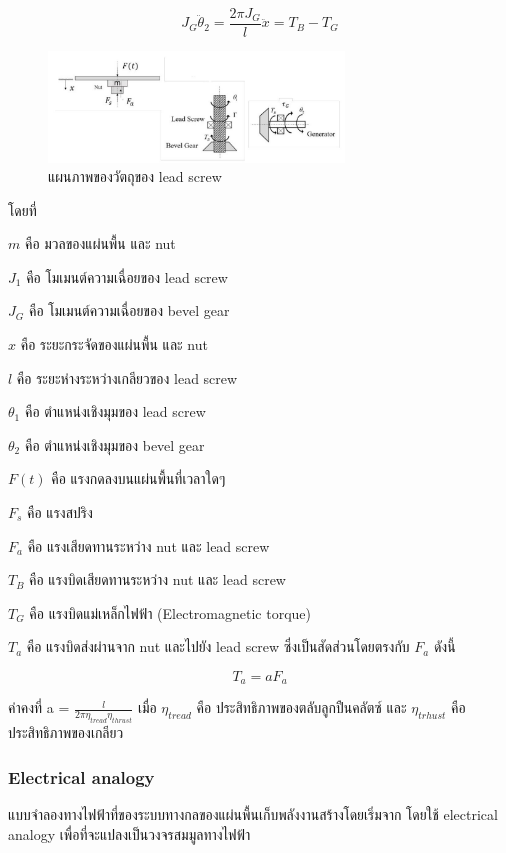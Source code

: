 \documentclass[11pt,a4paper]{article}
\begin{document}
\begin{equation}
    J_{G}\ddot{\theta}_{2} = \frac{2\pi J_{G}}{l}\ddot{x} = T_{B}-T_{G}
\end{equation}

\begin{figure}[h!]
    \begin{center}
        \includegraphics[width=0.7\textwidth]{free_body_lx.png}
    \end{center}
    \caption{แผนภาพของวัตถุของ lead screw}
    \label{free_body_lx}
\end{figure}

โดยที่

$m$ คือ มวลของแผ่นพื้น และ nut

$J_{1}$ คือ โมเมนต์ความเฉื่อยของ lead screw 

$J_{G}$ คือ โมเมนต์ความเฉื่อยของ bevel gear

$x$ คือ ระยะกระจัดของแผ่นพื้น และ nut

$l$ คือ ระยะห่างระหว่างเกลียวของ lead screw

$\theta_{1}$  คือ ตำแหน่งเชิงมุมของ lead screw 

$\theta_{2}$  คือ ตำแหน่งเชิงมุมของ bevel gear

$F(t)$  คือ แรงกดลงบนแผ่นพื้นที่เวลาใดๆ

$F_{s}$   คือ แรงสปริง

$F_{a}$   คือ แรงเสียดทานระหว่าง nut และ lead screw

$T_{B}$   คือ แรงบิดเสียดทานระหว่าง nut และ lead screw

$T_{G}$   คือ แรงบิดแม่เหล็กไฟฟ้า (Electromagnetic torque)

$T_{a}$   คือ แรงบิดส่งผ่านจาก nut และไปยัง lead screw ซึ่งเป็นสัดส่วนโดยตรงกับ $F_{a}$ ดังนี้

\begin{equation}
    T_{a} = aF_{a}
\end{equation}

ค่าคงที่ a = $\frac{l}{2\pi \eta_{tread} \eta_{thrust}}$ เมื่อ $\eta_{tread}$ คือ ประสิทธิภาพของตลับลูกปืนคลัตซ์ และ $\eta_{trhust}$ คือ ประสิทธิภาพของเกลียว

\subsubsection{Electrical analogy}
แบบจำลองทางไฟฟ้าที่ของระบบทางกลของแผ่นพื้นเก็บพลังงานสร้างโดยเริ่มจาก โดยใช้ electrical analogy เพื่อที่จะแปลงเป็นวงจรสมมูลทางไฟฟ้า
\end{document}
